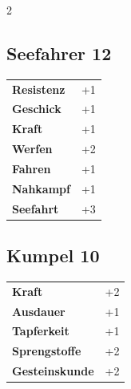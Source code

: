 \begin{multicols}{2}
\begin{tcolorbox}

\end{tcolorbox}

\begin{tcolorbox}
    \subsection*{Seefahrer \hfill \small{12 }}
    \tcblower




\begin{tabular}{@{}ll@{}}
    \textbf{Resistenz} & +1\\
    \textbf{Geschick} & +1\\
    \textbf{Kraft} & +1\\
    \textbf{Werfen} & +2\\
    \textbf{Fahren} & +1\\
    \textbf{Nahkampf} & +1\\
    \textbf{Seefahrt} & +3\\
\end{tabular}


\end{tcolorbox}

\begin{tcolorbox}
    \subsection*{Kumpel \hfill \small{10 }}
    \tcblower




\begin{tabular}{@{}ll@{}}
    \textbf{Kraft} & +2\\
    \textbf{Ausdauer} & +1\\
    \textbf{Tapferkeit} & +1\\
    \textbf{Sprengstoffe} & +2\\
    \textbf{Gesteinskunde} & +2\\
\end{tabular}



\end{tcolorbox}
\end{multicols}

